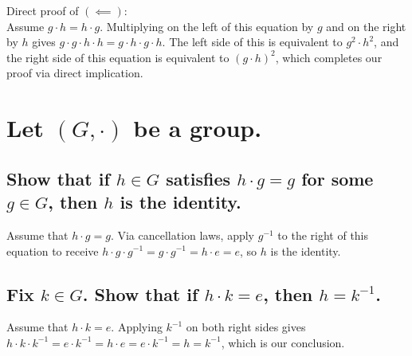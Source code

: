 \documentclass[12pt,letterpaper]{article}
\begin{document}
	Direct proof of \((\impliedby)\): \\
	
	Assume \(g \cdot h = h\cdot g\). Multiplying on the left of this equation by \(g\) and on the right by \(h\) gives \(g \cdot g \cdot h \cdot h = g \cdot h \cdot g \cdot h\). The left side of this is equivalent to \(g^{2} \cdot h^{2}\), and the right side of this equation is equivalent to \((g \cdot h)^{2}\), which completes our proof via direct implication.
	
\section{Let \((G, \cdot)\) be a group.}

\subsection{Show that if \(h \in G\) satisfies \(h \cdot g = g\) for some \(g \in G\), then \(h\) is the identity.}

	Assume that \(h \cdot g = g\). Via cancellation laws, apply \(g^{-1}\) to the right of this equation to receive \(h \cdot g \cdot g^{-1} = g \cdot g^{-1} = h \cdot e = e\), so \(h\) is the identity.
	
\subsection{Fix \(k \in G\). Show that if \(h \cdot k = e\), then \(h = k^{-1}\).}

	Assume that \(h \cdot k = e\). Applying \(k^{-1}\) on both right sides gives \(h \cdot k \cdot k^{-1} = e \cdot k^{-1} = h \cdot e = e \cdot k^{-1} = h = k^{-1}\), which is our conclusion.
\end{document}
